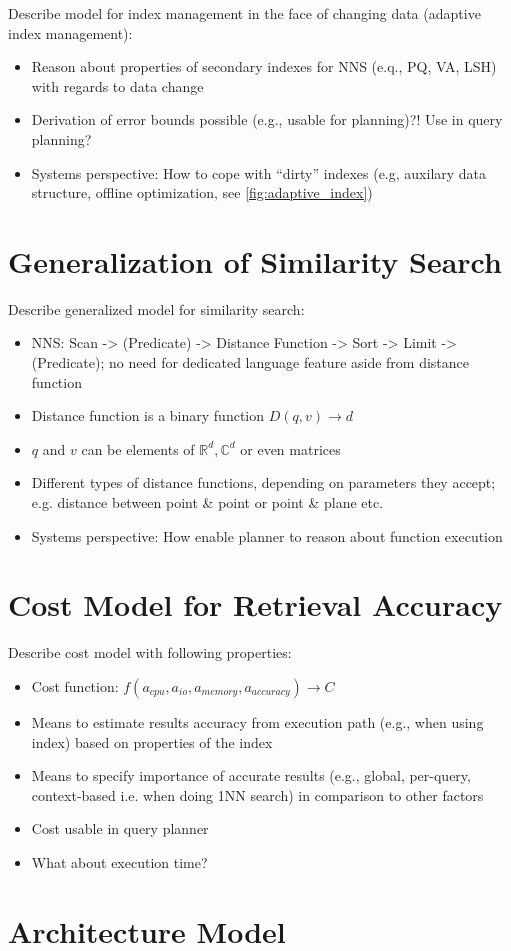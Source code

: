 Describe model for index management in the face of changing data (adaptive index management):

\begin{itemize}
    \item Reason about properties of secondary indexes for NNS (e.q., PQ, VA, LSH) with regards to data change
    \item Derivation of error bounds possible (e.g., usable for planning)?! Use in query planning?
    \item Systems perspective: How to cope with ``dirty'' indexes (e.g, auxilary data structure, offline optimization, see \cref{fig:adaptive_index})
\end{itemize}

\section{Generalization of Similarity Search}

Describe generalized model for similarity search:

\begin{itemize}
    \item NNS: Scan -> (Predicate) -> Distance Function -> Sort -> Limit -> (Predicate); no need for dedicated language feature aside from distance function
    \item Distance function is a binary function $D(q,v) \longrightarrow d$
    \item $q$ and $v$ can be elements of $\mathbb{R}^d,\mathbb{C}^d$ or even matrices
    \item Different types of distance functions, depending on parameters they accept; e.g. distance between point \& point or point \& plane etc.
    \item Systems perspective: How enable planner to reason about function execution
\end{itemize}

\section{Cost Model for Retrieval Accuracy}
Describe cost model with following properties:

\begin{itemize}
    \item Cost function: $f(a_{cpu}, a_{io}, a_{memory}, a_{accuracy}) \longrightarrow C$
    \item Means to estimate results accuracy from execution path (e.g., when using index) based on properties of the index
    \item Means to specify importance of accurate results (e.g., global, per-query, context-based i.e. when doing 1NN search) in comparison to other factors
    \item Cost usable in query planner
    \item What about execution time?
\end{itemize}

\section{Architecture Model}





